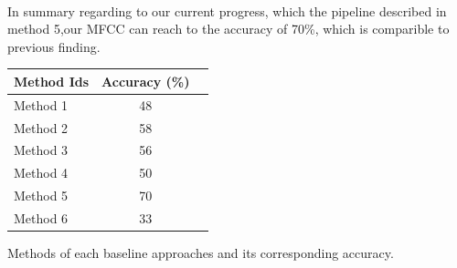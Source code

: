 \documentclass[final]{siamltexmm}
\begin{document}
\\In summary regarding to our current progress, which the pipeline described in method 5,our MFCC can reach to the accuracy of 70\%, which is comparible to previous finding.
\\
\begin{center}
  \begin{tabular}{ l || c | r }
    \hline
    Method Ids & Accuracy (\%) \\ \hline \hline
    Method 1 & 48 \\ \hline
    Method 2 & 58 \\ \hline
    Method 3 & 56 \\ \hline
    Method 4 & 50 \\ \hline
    Method 5 & 70 \\ \hline
    Method 6 & 33 \\ \hline
    \hline
  \end{tabular}
  \begin{tablenotes}
    \small
    \item Methods of each baseline approaches and its corresponding accuracy.
  \end{tablenotes}
\end{center}
\end{document}
